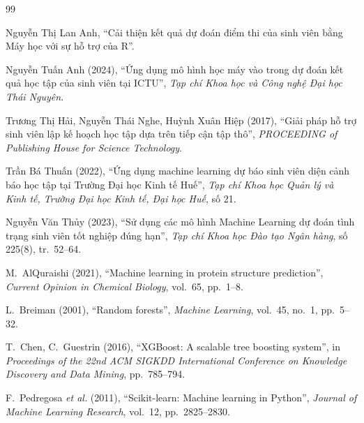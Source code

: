 \documentclass[12pt,a4paper,oneside]{report}
\newcommand{\bmchapname}{Chương}
\renewcommand{\appendixname}{Phụ lục}%
\newcommand{\tocchapname}{Chương}
\begin{document}
\begin{thebibliography}{99}
\setlength{\itemsep}{2pt}

Nguyễn Thị Lan Anh, ``Cải thiện kết quả dự đoán điểm thi của sinh viên
bằng Máy học với sự hỗ trợ của R''.

Nguyễn Tuấn Anh (2024), ``Ứng dụng mô hình học máy vào trong dự đoán kết
quả học tập của sinh viên tại ICTU'', \textit{Tạp chí Khoa học và Công nghệ
Đại học Thái Nguyên}.

Trương Thị Hải, Nguyễn Thái Nghe, Huỳnh Xuân Hiệp (2017), ``Giải pháp hỗ trợ
sinh viên lập kế hoạch học tập dựa trên tiếp cận tập thô'',
\textit{PROCEEDING of Publishing House for Science Technology}.

Trần Bá Thuấn (2022), ``Ứng dụng machine learning dự báo sinh viên diện cảnh
báo học tập tại Trường Đại học Kinh tế Huế'', \textit{Tạp chí Khoa học Quản
lý và Kinh tế, Trường Đại học Kinh tế, Đại học Huế}, số 21.

Nguyễn Văn Thủy (2023), ``Sử dụng các mô hình Machine Learning dự đoán tình
trạng sinh viên tốt nghiệp đúng hạn'', \textit{Tạp chí Khoa học Đào tạo
Ngân hàng}, số 225(8), tr.~52--64.

M.~AlQuraishi (2021), ``Machine learning in protein structure prediction'',
\textit{Current Opinion in Chemical Biology}, vol.~65, pp.~1--8.

L.~Breiman (2001), ``Random forests'', \textit{Machine Learning}, vol.~45,
no.~1, pp.~5--32.

T.~Chen, C.~Guestrin (2016), ``XGBoost: A scalable tree boosting system'',
in \textit{Proceedings of the 22nd ACM SIGKDD International Conference on
Knowledge Discovery and Data Mining}, pp.~785--794.

F.~Pedregosa \textit{et al.} (2011), ``Scikit-learn: Machine learning in
Python'', \textit{Journal of Machine Learning Research}, vol.~12,
pp.~2825--2830.

\end{thebibliography}

\appendix
\renewcommand{\bmchapname}{Phụ lục}
\addtocontents{toc}{\protect\renewcommand{\protect\tocchapname}{\appendixname}}
\end{document}
